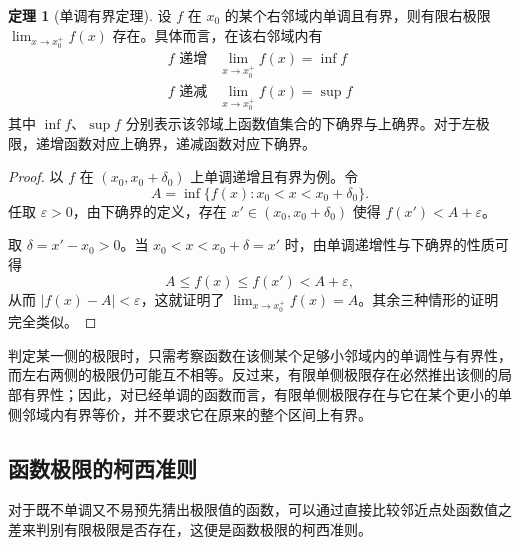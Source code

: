 \documentclass[UTF8,fontset=fandol,a4paper,12pt]{ctexart}
\theoremstyle{definition}
\newtheorem{theorem}{定理}
\begin{document}
\begin{theorem}[单调有界定理]
设 $f$ 在 $x_0$ 的某个右邻域内单调且有界，则有限右极限 $\lim_{x\to x_0^+}f(x)$ 存在。具体而言，在该右邻域内有
\[
 \begin{array}{c|c}
 f\text{ 递增}&\displaystyle\lim_{x\to x_0^+}f(x)=\inf f\\[0.5em]
 f\text{ 递减}&\displaystyle\lim_{x\to x_0^+}f(x)=\sup f
 \end{array}
\]
其中 $\inf f$、$\sup f$ 分别表示该邻域上函数值集合的下确界与上确界。对于左极限，递增函数对应上确界，递减函数对应下确界。
\end{theorem}
\begin{proof}
以 $f$ 在 $(x_0,x_0+\delta_0)$ 上单调递增且有界为例。令
\[
 A=\inf\{f(x):x_0<x<x_0+\delta_0\}.
\]
任取 $\varepsilon>0$，由下确界的定义，存在 $x'\in(x_0,x_0+\delta_0)$ 使得 $f(x')<A+\varepsilon$。

取 $\delta=x'-x_0>0$。当 $x_0<x<x_0+\delta=x'$ 时，由单调递增性与下确界的性质可得
\[
 A\le f(x)\le f(x')<A+\varepsilon,
\]
从而 $|f(x)-A|<\varepsilon$，这就证明了 $\lim_{x\to x_0^+}f(x)=A$。其余三种情形的证明完全类似。
\end{proof}

判定某一侧的极限时，只需考察函数在该侧某个足够小邻域内的单调性与有界性，而左右两侧的极限仍可能互不相等。反过来，有限单侧极限存在必然推出该侧的局部有界性；因此，对已经单调的函数而言，有限单侧极限存在与它在某个更小的单侧邻域内有界等价，并不要求它在原来的整个区间上有界。

\subsection*{函数极限的柯西准则}
对于既不单调又不易预先猜出极限值的函数，可以通过直接比较邻近点处函数值之差来判别有限极限是否存在，这便是函数极限的柯西准则。
\end{document}
